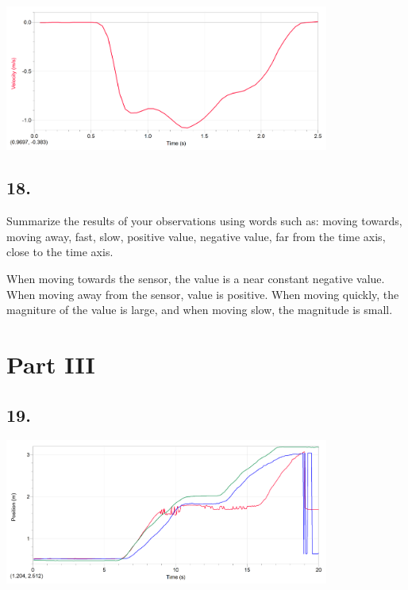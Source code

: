     \begin{mdframed}
        \centering\includegraphics[width=0.8\textwidth]{image21.png}
    \end{mdframed}

    \subsection*{18.}
    Summarize the results of your observations using words such as: moving towards, moving away, fast, slow, positive value, negative value, far from the time axis, close to the time axis.

    \begin{mdframed}
        When moving towards the sensor, the value is a near constant negative value. When moving away from the sensor, value is positive. When moving quickly, the magniture of the value is large, and when moving slow, the magnitude is small.
    \end{mdframed}

    \section*{Part III}

    \subsection*{19.}

    \begin{mdframed}
        \centering\includegraphics[width=0.8\textwidth]{image7.png}
    \end{mdframed}

